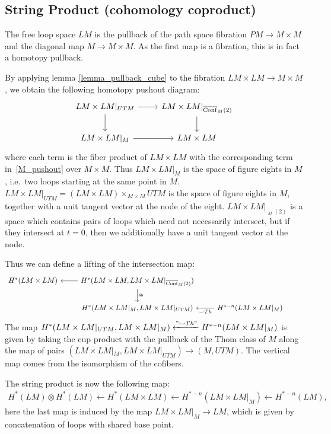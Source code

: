 \documentclass{scrartcl}
\theoremstyle{plain}
\theoremstyle{definition}
\newcommand{\cupp}{\mathbin{\smile}}
\newcommand{\iso}{\cong}
\newcommand{\from}{\leftarrow}
\DeclareMathOperator{\cConf}{\overline{Conf}}
\begin{document}
\subsection{String Product (cohomology coproduct)}\label{subsec:string-product}
The free loop space $LM$ is the pullback of the path space fibration $PM \to M\times M$ and the diagonal map $M\to M\times M$. As the first map is a fibration, this is in fact a homotopy pullback. %

By applying lemma \ref{lemma_pullback_cube} to the fibration $LM\times LM\to M\times M$, we obtain the following homotopy pushout diagram:
\begin{equation}
    \begin{tikzcd}
        LM\times LM|_{UTM} \rar\dar & LM\times LM |_{\cConf_M(2)} \dar \\
        LM\times LM|_M \rar & LM\times LM
    \end{tikzcd}
\end{equation}
where each term is the fiber product of $LM\times LM$ with the corresponding term in~\ref{M_pushout} over $M\times M$. Thus $LM\times LM|_M$ is the space of figure eights in $M$, i.e.\ two loops starting at the same point in $M$. $LM\times LM|_{UTM} = (LM\times LM)\times_{M\times M} UTM$ is the space of figure eights in $M$, together with a unit tangent vector at the node of the eight. $LM\times LM|_{\cConf_M(2)}$ is a space which contains pairs of loops which need not necessarily intersect, but if they intersect at $t=0$, then we additionally have a unit tangent vector at the node. 

Thus we can define a lifting of the intersection map:
\begin{equation}
    \begin{tikzcd}
        H^{*}(LM \times LM) & \lar H^*(LM\times LM, LM\times LM|_{\cConf_M(2)}) \dar["\iso"] & &\\
        & H^*(LM\times LM|_{M}, LM\times LM|_{UTM}) & \lar["\cupp Th"] H^{*-n}(LM\times LM|_M)
    \end{tikzcd}
\end{equation}
The map $H^*(LM\times LM|_{UTM}, LM\times LM|_M) \xleftarrow{"\cupp Th"} H^{*-n}(LM\times LM|_M)$ is given by taking the cup product with the pullback of the Thom class of $M$ along the map of pairs $(LM\times LM|_{M}, LM\times LM|_{UTM}) \to (M, UTM)$. The vertical map comes from the isomorphism of the cofibers. 

The string product is now the following map: 
\begin{align*}
    H^*(LM)\otimes H^*(LM) \from H^*(LM\times LM) \from H^{*-n}(LM\times LM|_M) \from H^{*-n}(LM),
\end{align*}
here the last map is induced by the map $LM\times LM|_M \to LM$, which is given by concatenation of loops with shared base point.
\end{document}

